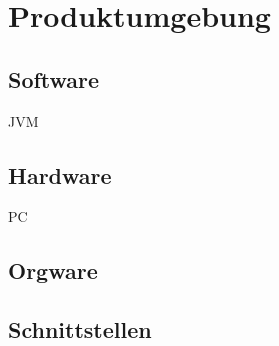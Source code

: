 \documentclass[a4paper,10pt]{article}
\begin{document}
\section{Produktumgebung}
\subsection{Software}
JVM
\subsection{Hardware}
PC
\subsection{Orgware}
\subsection{Schnittstellen}
\end{document}
